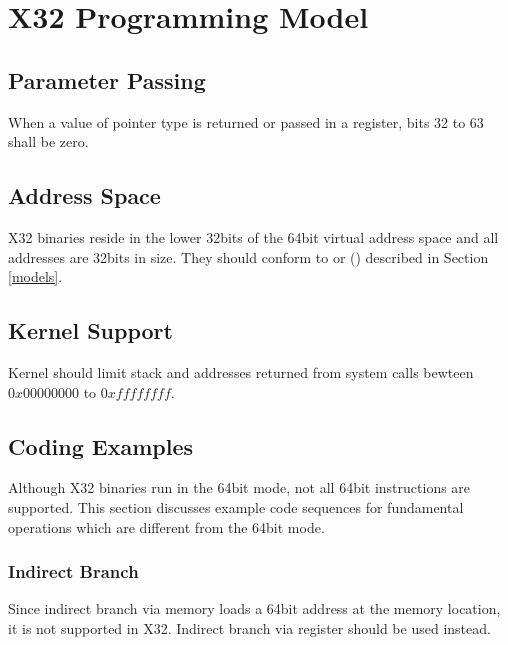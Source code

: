 \chapter{X32 Programming Model\label{x32}}

\section{Parameter Passing}
When a value of pointer type is returned or passed in a register, bits 32
to 63 shall be zero.

\section{Address Space}

\xARCH X32 binaries reside in the lower 32bits of the 64bit virtual
address space and all addresses are 32bits in size.  They should conform
to  or
 ()
described in Section \ref{models}.

\section{Kernel Support}
Kernel should limit stack and addresses returned from system calls
bewteen $0x00000000$ to $0xffffffff$.

\section{Coding Examples}

Although X32 binaries run in the 64bit mode, not all 64bit instructions
are supported. This section discusses example code sequences for
fundamental operations which are different from the 64bit mode.

\subsection{Indirect Branch}

Since indirect branch via memory loads a 64bit address at the memory
location, it is not supported in X32.  Indirect branch via register
should be used instead.

